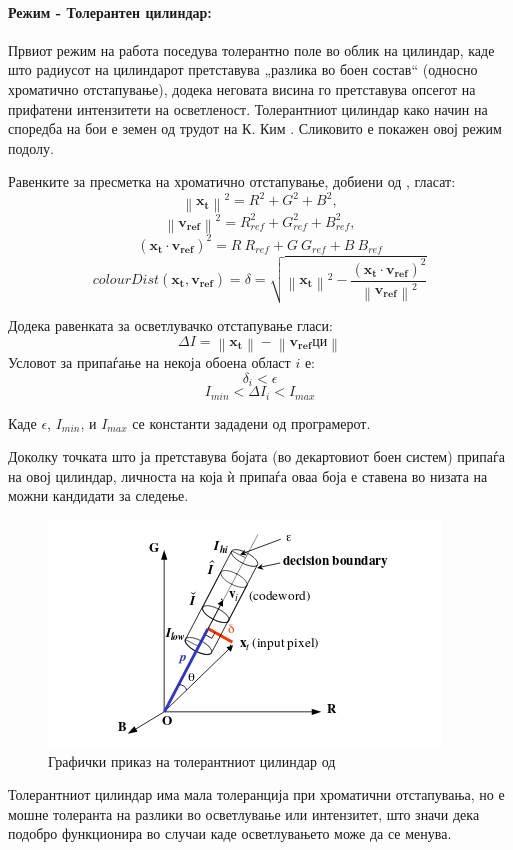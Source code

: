\documentclass[12pt]{article}
\newcommand\norm[1]{\left\lVert#1\right\rVert}
\renewcommand{\vec}[1]{\mathbf{#1}}
\begin{document}
      \paragraph{Режим - Толерантен цилиндар:\\}
        Првиот режим на работа поседува толерантно поле во облик на цилиндар, каде што радиусот на цилиндарот претставува „разлика во боен состав“ (односно хроматично отстапување), додека неговата висина го претставува опсегот на прифатени интензитети на осветленост. Толерантниот цилиндар како начин на споредба на бои е земен од трудот на К. Ким \cite{kim}. Сликовито е покажен овој режим подолу.

        Равенките за пресметка на хроматично отстапување, добиени од \cite{kim}, гласат:
        $$  \norm{\vec{x_t}}^2 = R^2 + G^2 + B^2,$$
        $$  \norm{\vec{v_{ref}}}^2 = R_{ref}^2 + G_{ref}^2 + B_{ref}^2, $$
        $$    (\vec{x_t} \cdot \vec{v_{ref}})^2 = R\ R_{ref} + G\ G_{ref} + B\ B_{ref} $$
        $$    colourDist(\vec{x_t}, \vec{v_{ref}}) = \delta = \sqrt{\norm{\vec{x_t}}^2 - \frac{(\vec{x_t} \cdot \vec{v_{ref}})^2}{\norm{\vec{v_{ref}}}^2}} $$
        \bigbreak

        Додека равенката за осветлувачко отстапување гласи:
        $$ \Delta I = \norm{\vec{x_t}} - \norm{\vec{v_{ref}} ци} $$
        \bigbreak
        Условот за припаѓање на некоја обоена област $i$ е:
        $$ \delta_{i} < \epsilon $$
        $$ I_{min}< \Delta I_i < I_{max} $$

        Каде $\epsilon$, $I_{min}$, и $I_{max}$ се константи зададени од програмерот.

        Доколку точката што ја претставува бојата (во декартовиот боен систем) припаѓа на овој цилиндар, личноста на која ѝ припаѓа оваа боја е ставена во низата на можни кандидати за следење.
        \begin{figure}[H]
          \centering
          \includegraphics[width = 0.4\linewidth]{./images/cylinder.png}
          \caption{Графички приказ на толерантниот цилиндар од \cite{kim}}
          \label{fig:cylinder}
        \end{figure}

        Толерантниот цилиндар има мала толеранција при хроматични отстапувања, но е мошне толеранта на разлики во осветлување или интензитет, што значи дека подобро функционира во случаи каде осветлувањето може да се менува.
\end{document}
